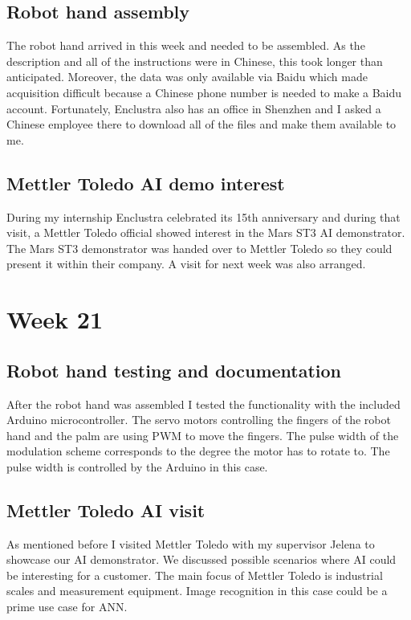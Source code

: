 \subsection{Robot hand assembly}
The robot hand arrived in this week and needed to be assembled. As the description and all of the instructions were in Chinese, this took longer than anticipated. Moreover, the data was only available via Baidu which made acquisition difficult because a Chinese phone number is needed to make a Baidu account. Fortunately, Enclustra also has an office in Shenzhen and I asked a Chinese employee there to download all of the files and make them available to me.
\subsection{Mettler Toledo \ac{AI} demo interest}
During my internship Enclustra celebrated its 15th anniversary and during that visit, a Mettler Toledo official showed interest in the Mars ST3 \ac{AI} demonstrator. The Mars ST3 demonstrator was handed over to Mettler Toledo so they could present it within their company. A visit for next week was also arranged.

\section{Week 21}
\subsection{Robot hand testing and documentation}
After the robot hand was assembled I tested the functionality with the included Arduino microcontroller. The servo motors controlling the fingers of the robot hand and the palm are using \ac{PWM} to move the fingers. The pulse width of the modulation scheme corresponds to the degree the motor has to rotate to. The pulse width is controlled by the Arduino in this case.
\subsection{Mettler Toledo \ac{AI} visit}
As mentioned before I visited Mettler Toledo with my supervisor Jelena to showcase our \ac{AI} demonstrator. We discussed possible scenarios where \ac{AI} could be interesting for a customer. The main focus of Mettler Toledo is industrial scales and measurement equipment. Image recognition in this case could be a prime use case for \ac{ANN}.

